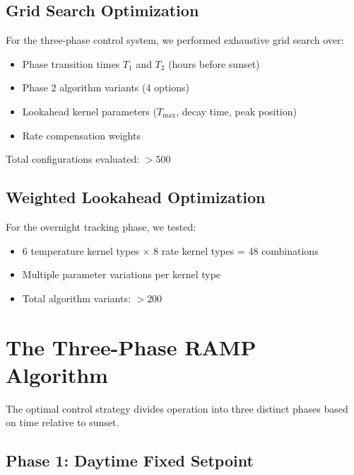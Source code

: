 \documentclass[11pt,letterpaper]{article}
\begin{document}
\subsection{Grid Search Optimization}

For the three-phase control system, we performed exhaustive grid search over:
\begin{itemize}[noitemsep]
    \item Phase transition times $T_1$ and $T_2$ (hours before sunset)
    \item Phase 2 algorithm variants (4 options)
    \item Lookahead kernel parameters ($T_{\max}$, decay time, peak position)
    \item Rate compensation weights
\end{itemize}

Total configurations evaluated: $>$500

\subsection{Weighted Lookahead Optimization}

For the overnight tracking phase, we tested:
\begin{itemize}[noitemsep]
    \item 6 temperature kernel types $\times$ 8 rate kernel types = 48 combinations
    \item Multiple parameter variations per kernel type
    \item Total algorithm variants: $>$200
\end{itemize}

\section{The Three-Phase RAMP Algorithm}

The optimal control strategy divides operation into three distinct phases based on time relative to sunset.

\subsection{Phase 1: Daytime Fixed Setpoint}

\begin{center}
\end{center}
\end{document}
